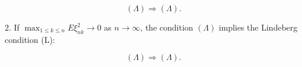 $$(\Lambda) \Rightarrow (\Lambda).$$

2. If $\max_{1 \leq k \leq n} E \xi_{nk}^2 \rightarrow 0$ as $n \rightarrow \infty$, the condition $(\Lambda)$ implies the Lindeberg condition (L):

$$(\Lambda) \Rightarrow (\Lambda).$$
